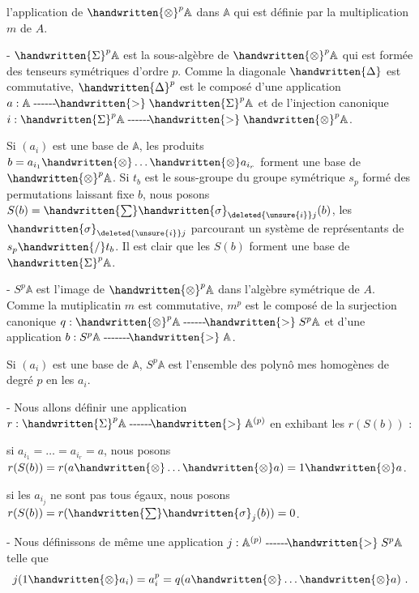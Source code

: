 l'application de $\handwritten{\otimes}^{p}\mathbb{A}$ dans $\mathbb{A}$ qui est définie par la multiplication $m$ de $A$.

\noindent - $\handwritten{\Sigma}^{p}\mathbb{A}$ est la sous-algèbre de $\handwritten{\otimes}^{p}\mathbb{A}$ qui est formée des tenseurs symétriques d'ordre $p$. Comme la diagonale $\handwritten{\Delta}$ est commutative, $\handwritten{\Delta}^{p}$ est le composé d'une application $a:\mathbb{A}\mathrel{\text{-{}-{}-{}-{}-{}-}\!\handwritten{>}}\handwritten{\Sigma}^{p}\mathbb{A}$ et de l'injection canonique $i:\handwritten{\Sigma}^{p}\mathbb{A}\mathrel{\text{-{}-{}-{}-{}-{}-}\!\handwritten{>}}\handwritten{\otimes}^{p}\mathbb{A}$.

Si $(a_i)$ est une base de $\mathbb{A}$, les produits $b=a_{i_1}\handwritten{\otimes}\ldots\handwritten{\otimes}a_{i_r}$ forment une base de $\handwritten{\otimes}^{p}\mathbb{A}$. Si $t_b$ est le sous-groupe du groupe symétrique $s_p$ formé des permutations laissant fixe $b$, nous posons $S(b)=\handwritten{\sum}\handwritten{\sigma}_{\deleted{\unsure{i}}j}(b)$, les $\handwritten{\sigma}_{\deleted{\unsure{i}}j}$ parcourant un système de représentants de $s_p\handwritten{/}t_b$. Il est clair que les $S(b)$ forment une base de $\handwritten{\Sigma}^{p}\mathbb{A}$.

\noindent - $S^{p}\mathbb{A}$ est l'image de $\handwritten{\otimes}^{p}\mathbb{A}$ dans l'algèbre symétrique de $A$. Comme la mutiplicatin $m$ est commutative, $m^p$ est le composé de la surjection canonique $q:\handwritten{\otimes}^{p}\mathbb{A}\mathrel{\text{-{}-{}-{}-{}-{}-}\!\handwritten{>}}S^p\mathbb{A}$ et d'une application $b:S^p\mathbb{A}\mathrel{\text{-{}-{}-{}-{}-{}-{}-}\!\handwritten{>}}\mathbb{A}$.

Si $(a_i)$ est une base de $\mathbb{A}$, $S^p\mathbb{A}$ est l'ensemble des polynô mes homogènes de degré $p$ en les $a_i$.

\noindent - Nous allons définir une application $r:\handwritten{\Sigma}^{p}\mathbb{A}\mathrel{\text{-{}-{}-{}-{}-{}-}\!\handwritten{>}}\mathbb{A}^{(p)}$ en exhibant les $r(S(b))$ :

si $a_{i_1}=\ldots=a_{i_r}=a$, nous posons $r(S(b))=r(a\handwritten{\otimes}\ldots\handwritten{\otimes}a)=1\handwritten{\otimes}a$.

si les $a_{i_j}$ ne sont pas tous égaux, nous posons $r(S(b))=r(\handwritten{\sum}\handwritten{\sigma}_j(b))=0$.

\noindent - Nous définissons de même une application $j:\mathbb{A}^{(p)}\mathrel{\text{-{}-{}-{}-{}-{}-}\!\handwritten{>}}S^p\mathbb{A}$ telle que
\[
j(1\handwritten{\otimes}a_i)=a_i^p=q(a\handwritten{\otimes}\ldots\handwritten{\otimes}a)\ .
\]
